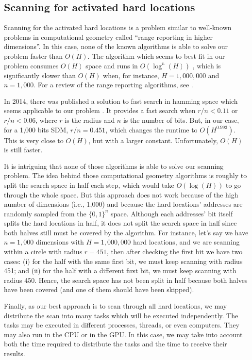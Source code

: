 \subsection{Scanning for activated hard locations}

Scanning for the activated hard locations is a problem similar to well-known problems in computational geometry called ``range reporting in higher dimensions''. In this case, none of the known algorithms is able to solve our problem faster than $O(H)$. The algorithm which seems to best fit in our problem consumes $O(H)$ space and runs in $O(\log^n(H))$ \citep{chazelle1988functional}, which is significantly slower than $O(H)$ when, for instance, $H=1,000,000$ and $n=1,000$. For a review of the range reporting algorithms, see \citet{chan2011orthogonal}.

In 2014, there was published a solution to fast search in hamming space which seems applicable to our problem \citet{norouzi2014fast}. It provides a fast search when $r/n < 0.11$ or $r/n < 0.06$, where $r$ is the radius and $n$ is the number of bits. But, in our case, for a 1,000 bits SDM, $r/n = 0.451$, which changes the runtime to $O(H^{0.993})$. This is very close to $O(H)$, but with a larger constant. Unfortunately, $O(H)$ is still faster.

It is intriguing that none of those algorithms is able to solve our scanning problem. The idea behind those computational geometry algorithms is roughly to split the search space in half each step, which would take $O(\log(H))$ to go through the whole space. But this approach does not work because of the high number of dimensions (i.e., 1,000) and because the hard locations' addresses are randomly sampled from the $\{0, 1\}^n$ space. Although each addresses' bit itself splits the hard locations in half, it does not split the search space in half since both halves still must be covered by the algorithm. For instance, let's say we have $n=1,000$ dimensions with $H=1,000,000$ hard locations, and we are scanning within a circle with radius $r=451$, then after checking the first bit we have two cases: (i) for the half with the same first bit, we must keep scanning with radius 451; and (ii) for the half with a different first bit, we must keep scanning with radius 450. Hence, the search space has not been split in half because both halves have been covered (and one of them should have been skipped).

Finally, as our best approach is to scan through all hard locations, we may distribute the scan into many tasks which will be executed independently. The tasks may be executed in different processes, threads, or even computers. They may also run in the CPU or in the GPU. In this case, we may take into account both the time required to distribute the tasks and the time to receive their results.

